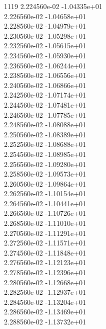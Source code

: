 1119	2.224560e-02	-1.04335e+01	\\ 	2.226560e-02	-1.04658e+01	\\ 	2.228560e-02	-1.04979e+01	\\ 	2.230560e-02	-1.05298e+01	\\ 	2.232560e-02	-1.05615e+01	\\ 	2.234560e-02	-1.05930e+01	\\ 	2.236560e-02	-1.06244e+01	\\ 	2.238560e-02	-1.06556e+01	\\ 	2.240560e-02	-1.06866e+01	\\ 	2.242560e-02	-1.07174e+01	\\ 	2.244560e-02	-1.07481e+01	\\ 	2.246560e-02	-1.07785e+01	\\ 	2.248560e-02	-1.08088e+01	\\ 	2.250560e-02	-1.08389e+01	\\ 	2.252560e-02	-1.08688e+01	\\ 	2.254560e-02	-1.08985e+01	\\ 	2.256560e-02	-1.09280e+01	\\ 	2.258560e-02	-1.09573e+01	\\ 	2.260560e-02	-1.09864e+01	\\ 	2.262560e-02	-1.10154e+01	\\ 	2.264560e-02	-1.10441e+01	\\ 	2.266560e-02	-1.10726e+01	\\ 	2.268560e-02	-1.11010e+01	\\ 	2.270560e-02	-1.11291e+01	\\ 	2.272560e-02	-1.11571e+01	\\ 	2.274560e-02	-1.11848e+01	\\ 	2.276560e-02	-1.12123e+01	\\ 	2.278560e-02	-1.12396e+01	\\ 	2.280560e-02	-1.12668e+01	\\ 	2.282560e-02	-1.12937e+01	\\ 	2.284560e-02	-1.13204e+01	\\ 	2.286560e-02	-1.13469e+01	\\ 	2.288560e-02	-1.13732e+01	\\ \hline
